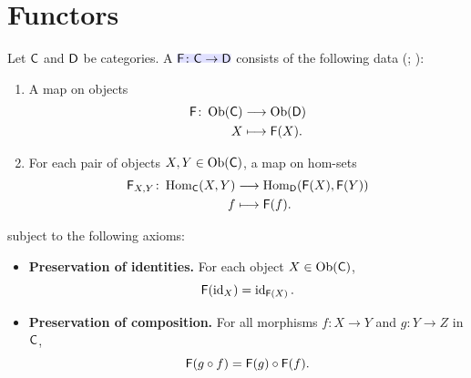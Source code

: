 \documentclass[../preamble]{subfiles}
\begin{document}
\section{Functors}
\label{sec:functor}

Let $\mathsf{C}$ and $\mathsf{D}$ be categories.
A  $\newmath{\Functor{F} \colon \Category{C} \lto \Category{D}}$
consists of the following data
(; ):
\begin{enumerate}
  \item A map on objects
    \begin{equation}
      \begin{aligned}
        \Functor{F} \colon \Ob(\Category{C}) &\lto \Ob(\Category{D}) \\
        X &\lmapsto \Functor{F}(X).
      \end{aligned}
      \label{eq:functor-ob}
    \end{equation}
  \item For each pair of objects $X, Y \in \operatorname{Ob}(\mathsf{C})$,
    a map on hom-sets
    \begin{equation}
      \begin{aligned}
        \Functor{F}_{X,Y} \colon
          \Hom_{\Category{C}}(X, Y)
          &\lto
          \Hom_{\Category{D}}(\Functor{F}(X), \Functor{F}(Y)) \\
        f &\lmapsto \Functor{F}(f).
      \end{aligned}
      \label{eq:functor-hom}
    \end{equation}
\end{enumerate}

subject to the following axioms:
\begin{itemize}
  \item \textbf{Preservation of identities.}
    For each object $X \in \operatorname{Ob}(\mathsf{C})$,
    \begin{equation}
      \label{eq:functor-id}
      \mathsf{F}(\operatorname{id}_X) = \operatorname{id}_{\mathsf{F}(X)}.
    \end{equation}

  \item \textbf{Preservation of composition.}
    For all morphisms $f \colon X \to Y$ and $g \colon Y \to Z$ in $\mathsf{C}$,
    \begin{equation}
      \label{eq:functor-comp}
      \mathsf{F}(g \circ f) = \mathsf{F}(g) \circ \mathsf{F}(f).
    \end{equation}
\end{itemize}
\end{document}
